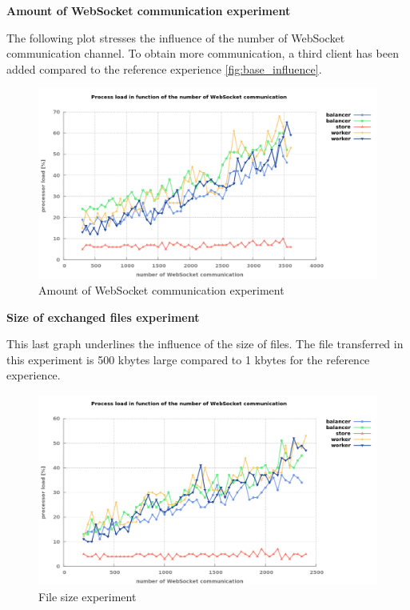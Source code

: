 \textbf{Amount of WebSocket communication experiment}

The following plot stresses the influence of the number of WebSocket communication
channel. To obtain more communication, a third client has been added compared to 
the reference experience \ref{fig:base_influence}.

\begin{figure}[H]
	\centering
		\includegraphics[width=\textwidth]{./Figures/communication_server_influence.png}
	\caption[Amount of WebSocket communication experiment]{Amount of WebSocket communication experiment}
	\label{fig:communication_server_influence}
\end{figure}

\textbf{Size of exchanged files experiment}

This last graph underlines the influence of the size of files. The file transferred in this experiment is
500 kbytes large compared to 1 kbytes for the reference experience.

\begin{figure}[H]
	\centering
		\includegraphics[width=\textwidth]{./Figures/file_server_influence.png}
	\caption[File size experiment]{File size experiment}
	\label{fig:file_server_influence}
\end{figure}


